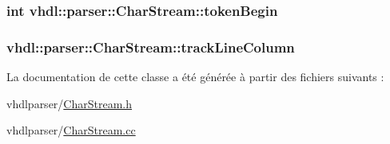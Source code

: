 \subsubsection[{token\+Begin}]{\setlength{\rightskip}{0pt plus 5cm}int vhdl\+::parser\+::\+Char\+Stream\+::token\+Begin\hspace{0.3cm}{\ttfamily [protected]}}\label{classvhdl_1_1parser_1_1_char_stream_aa9408d80c650063cb31f81c9a6cd590e}
\hypertarget{classvhdl_1_1parser_1_1_char_stream_a0d812351e15796fd8ea5bb48257794a4}{}
\subsubsection[{track\+Line\+Column}]{ vhdl\+::parser\+::\+Char\+Stream\+::track\+Line\+Column\hspace{0.3cm}{\ttfamily [protected]}}\label{classvhdl_1_1parser_1_1_char_stream_a0d812351e15796fd8ea5bb48257794a4}


La documentation de cette classe a été générée à partir des fichiers suivants \+:\begin{DoxyCompactItemize}
\item 
vhdlparser/\hyperlink{_char_stream_8h}{Char\+Stream.\+h}\item 
vhdlparser/\hyperlink{_char_stream_8cc}{Char\+Stream.\+cc}\end{DoxyCompactItemize}

